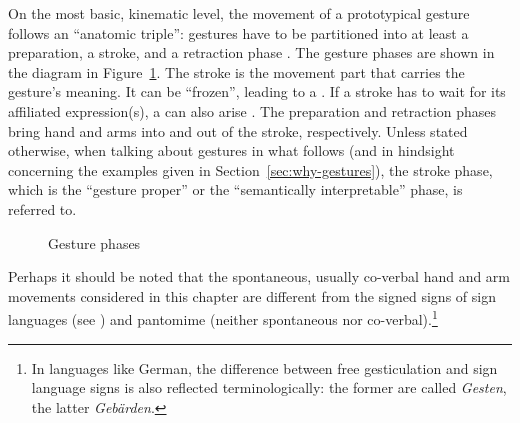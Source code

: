 \documentclass[output=paper]{langsci/langscibook}
\begin{document}
On the most basic, kinematic level, the movement of a prototypical gesture follows an \enquote{anatomic triple}: gestures have to be partitioned into at least a preparation,  a stroke, and a retraction  phase \citep{Kendon:1972}.
%
The gesture phases are shown in the diagram in Figure~\ref{fig:gesture-phases}.
%
The stroke is the movement part that carries the gesture's meaning. 
%
It can be \enquote{frozen}, leading to a . 
%
If a stroke has to wait for its affiliated expression(s), a  can also arise \citep{Kita:vanGijn:vanDerHulst:1999}.
%
The preparation and retraction phases bring hand and arms into and out of the stroke, respectively. 
%
Unless stated otherwise, when talking about gestures in what follows (and in hindsight concerning the examples given in Section~\ref{sec:why-gestures}), the stroke phase, which is the \enquote{gesture proper} or the \enquote{semantically interpretable} phase, is referred to.

\begin{figure}[tb]
  \centering
  \caption{Gesture phases}
  \label{fig:gesture-phases}
\end{figure}


Perhaps it should be noted that the spontaneous, usually co-verbal hand and arm movements considered in this chapter are different from the signed signs of sign languages  (see ) and pantomime  (neither spontaneous nor co-verbal).\footnote{In languages like German, the difference between free gesticulation and sign language signs is also reflected terminologically: the former are called \textit{Gesten}, the latter \textit{Gebärden}.}
\end{document}
